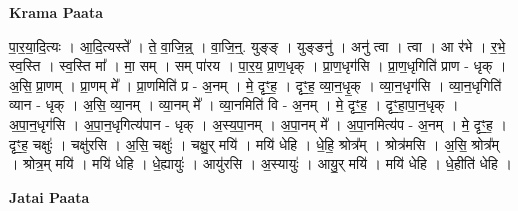 \documentclass[17pt]{extarticle}
\begin{document}
\textbf{Krama Paata} \newline

पा॒र॒या॒दि॒त्यः । आ॒दि॒त्यस्ते᳚ । ते॒ वा॒जि॒न्न्॒ । वा॒जि॒न्॒. युङ्‍ङ् । युङ्‍ङनु॑ । अनु॑ त्वा । त्वा । आ र॑भे । र॒भे॒ स्व॒स्ति । स्व॒स्ति मा᳚ । मा॒ सम् । सम् पा॑रय । पा॒र॒य॒ प्रा॒ण॒धृक् । प्रा॒ण॒धृग॑सि । प्रा॒ण॒धृगिति॑ प्राण - धृक् । अ॒सि॒ प्रा॒णम् । प्रा॒णम् मे᳚ । प्रा॒णमिति॑ प्र - अ॒नम् । मे॒ दृꣳ॒॒ह॒ । दृꣳ॒॒ह॒ व्या॒न॒धृ॒क् । व्या॒न॒धृग॑सि । व्या॒न॒धृगिति॑ व्यान - धृक् । अ॒सि॒ व्या॒नम् । व्या॒नम् मे᳚ । व्या॒नमिति॑ वि - अ॒नम् । मे॒ दृꣳ॒॒ह॒ । दृꣳ॒॒हा॒पा॒न॒धृक् । अ॒पा॒न॒धृग॑सि । अ॒पा॒न॒धृगित्य॑पान - धृक् । अ॒स्य॒पा॒नम् । अ॒पा॒नम् मे᳚ । अ॒पा॒नमित्य॑प - अ॒नम् । मे॒ दृꣳ॒॒ह॒ । दृꣳ॒॒ह॒ चक्षुः॑ । चक्षु॑रसि । अ॒सि॒ चक्षुः॑ । चक्षु॒र् मयि॑ । मयि॑ धेहि । धे॒हि॒ श्रोत्र᳚म् । श्रोत्र॑मसि । अ॒सि॒ श्रोत्र᳚म् । श्रोत्र॒म् मयि॑ । मयि॑ धेहि । धे॒ह्यायुः॑ । आयु॑रसि । अ॒स्यायुः॑ । आयु॒र् मयि॑ । मयि॑ धेहि । धे॒हीति॑ धेहि । \newline

\textbf{Jatai Paata} \newline
\end{document}
